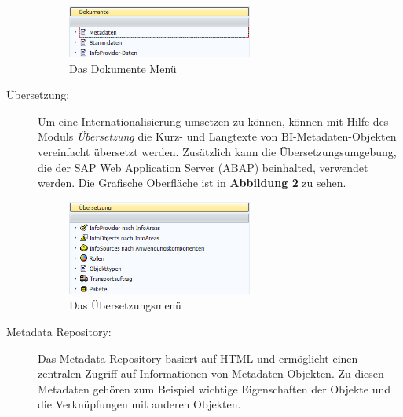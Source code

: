 \begin{description}
\begin{figure}[H]
    \centering
    \includegraphics[width=0.6\textwidth]{files/Dokumente}
    \caption{Das Dokumente Menü}
    \label{pic:Dokumente}
\end{figure}
\item[Übersetzung:] Um eine Internationalisierung umsetzen zu können, können mit Hilfe des Moduls \textit{Übersetzung} die Kurz- und Langtexte von BI-Metadaten-Objekten vereinfacht übersetzt werden. Zusätzlich kann die Übersetzungsumgebung, die der SAP Web Application Server (ABAP) beinhalted, verwendet werden.
Die Grafische Oberfläche ist in \textbf{Abbildung \ref{pic:Uebersetzung}} zu sehen.
\begin{figure}[H]
    \centering
    \includegraphics[width=0.6\textwidth]{files/Uebersetzung}
    \caption{Das Übersetzungsmenü}
    \label{pic:Uebersetzung}
\end{figure}
\item[Metadata Repository:] Das Metadata Repository basiert auf HTML und ermöglicht einen zentralen Zugriff auf Informationen von Metadaten-Objekten. Zu diesen Metadaten gehören zum Beispiel wichtige Eigenschaften der Objekte und die Verknüpfungen mit anderen Objekten.
\end{description}




